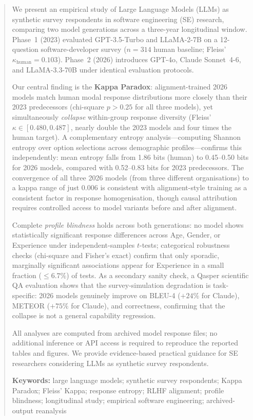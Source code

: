 \documentclass[12pt,a4paper]{article}
\begin{document}
\begin{abstract}
\noindent
We present an empirical study of Large Language Models (LLMs) as synthetic
survey respondents in software engineering (SE) research, comparing two
model generations across a three-year longitudinal window.
Phase~1 (2023) evaluated GPT-3.5-Turbo and LLaMA-2-7B on a 12-question
software-developer survey ($n{=}314$ human baseline; Fleiss'
$\kappa_{\text{human}}{=}0.103$).
Phase~2 (2026) introduces GPT-4o, Claude Sonnet~4-6, and LLaMA-3.3-70B
under identical evaluation protocols.

Our central finding is the \textbf{Kappa Paradox}: alignment-trained
2026 models match human modal response distributions more closely than
their 2023 predecessors (chi-square $p > 0.25$ for all three models), yet
simultaneously \emph{collapse} within-group response diversity (Fleiss'
$\kappa \in [0.480, 0.487]$, nearly double the 2023 models and four times
the human target).
A complementary entropy analysis---computing Shannon entropy over option
selections across demographic profiles---confirms this independently:
mean entropy falls from 1.86 bits (human) to 0.45--0.50 bits for 2026
models, compared with 0.52--0.83 bits for 2023 predecessors.
The convergence of all three 2026 models (from three different
organisations) to a kappa range of just 0.006 is consistent with
alignment-style training as a consistent factor in response homogenisation,
though causal attribution requires controlled access to model variants
before and after alignment.

Complete \emph{profile blindness} holds across both generations: no model
shows statistically significant response differences across Age, Gender,
or Experience under independent-samples $t$-tests; categorical robustness
checks (chi-square and Fisher's exact) confirm that only sporadic,
marginally significant associations appear for Experience in a small
fraction ($\leq 6.7\%$) of tests.
As a secondary sanity check, a Qasper scientific QA evaluation shows that
the survey-simulation degradation is task-specific: 2026 models genuinely
improve on BLEU-4 ($+24\%$ for Claude), METEOR ($+75\%$ for Claude), and
correctness, confirming that the collapse is not a general capability
regression.

All analyses are computed from archived model response files; no
additional inference or API access is required to reproduce the reported
tables and figures.
We provide evidence-based practical guidance for SE researchers considering
LLMs as synthetic survey respondents.

\bigskip
\noindent\textbf{Keywords:} large language models; synthetic survey
respondents; Kappa Paradox; Fleiss' Kappa; response entropy; RLHF
alignment; profile blindness; longitudinal study; empirical software
engineering; archived-output reanalysis
\end{abstract}
\end{document}
